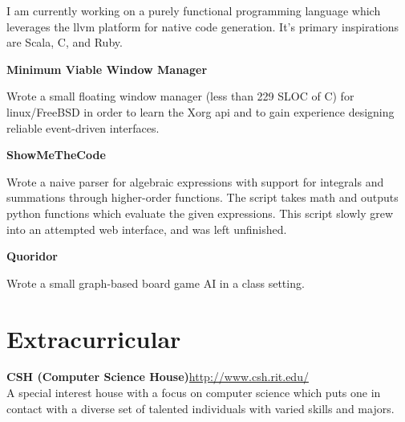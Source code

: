 \documentclass[letter,margin,line]{resume}
\newcommand{\rurl}[1]{\hfill {\footnotesize \url{#1}}}
\begin{document}
\begin{resume}
\begin{asparablank}
		\small I am currently working on a purely functional programming language which leverages the llvm platform for native code generation. It's primary inspirations are Scala, C, and Ruby. 
		\normalsize
		\\
	
		\item {\bf Minimum Viable Window Manager}
		
		\small Wrote a small floating window manager (less than 229 SLOC of C) for linux/FreeBSD in order to learn the Xorg api and to gain experience designing reliable event-driven interfaces. 
		\normalsize
		\\
		
		\item {\bf ShowMeTheCode}
		
		\small Wrote a naive parser for algebraic expressions with support for integrals and summations through higher-order functions. The script takes math and outputs python functions which evaluate the given expressions. This script slowly grew into an attempted web interface, and was left unfinished.
		\normalsize		
		\\

		\item {\bf Quoridor}
		
		\small Wrote a small graph-based board game AI in a class setting.
		\normalsize
		\\
		
	\end{asparablank}	

\section{\mysidestyle Extracurricular}
	\begin{asparablank}
		\item {\bf CSH ({\small Computer Science House})}\rurl{http://www.csh.rit.edu/}
		\\		
		\small A special interest house with a focus on computer science which puts one in contact with a diverse set of talented individuals with varied skills and majors.
	\end{asparablank}

\end{resume}
\end{document}
